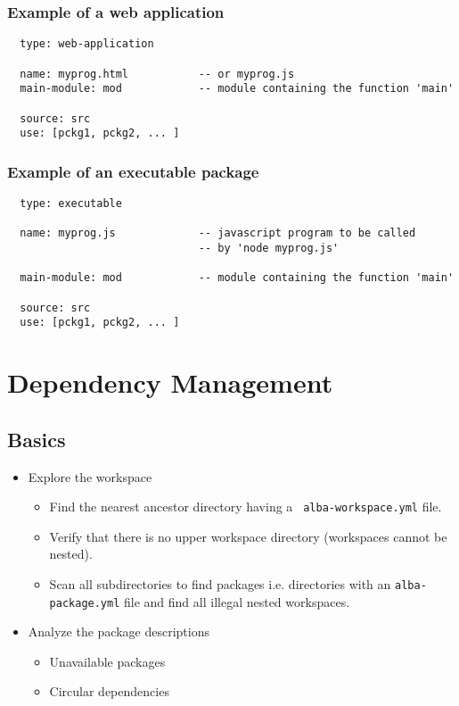 \subsubsection{ Example of a web application}
{\small
\begin{verbatim}
  type: web-application

  name: myprog.html           -- or myprog.js
  main-module: mod            -- module containing the function 'main'

  source: src
  use: [pckg1, pckg2, ... ]
\end{verbatim}
}


\subsubsection{ Example of an executable package}
{\small
\begin{verbatim}
  type: executable

  name: myprog.js             -- javascript program to be called
                              -- by 'node myprog.js'

  main-module: mod            -- module containing the function 'main'

  source: src
  use: [pckg1, pckg2, ... ]
\end{verbatim}
}






\section{Dependency Management}


\subsection{Basics}

\begin{itemize}

\item Explore the workspace
  \begin{itemize}

  \item Find the nearest ancestor directory having a {\tt\small
      alba-workspace.yml} file.

  \item Verify that there is no upper workspace directory (workspaces cannot
    be nested).

  \item Scan all subdirectories to find packages i.e. directories with an
    {\tt\small alba-package.yml} file and find all illegal nested workspaces.
  \end{itemize}

\item Analyze the package descriptions
  \begin{itemize}
  \item Unavailable packages
  \item Circular dependencies
  \end{itemize}
\end{itemize}

